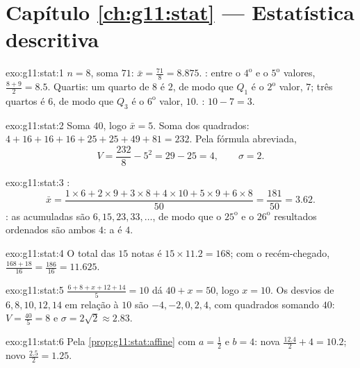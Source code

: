\section*{Capítulo \ref{ch:g11:stat} --- Estatística descritiva}

\begin{solution}{exo:g11:stat:1}
$n = 8$, soma $71$:  $\bar x = \frac{71}{8} = 8.875$. :  entre o $4^{\text{o}}$ e o $5^{\text{o}}$ valores,
$\frac{8 + 9}{2} = 8.5$. Quartis: um quarto de $8$ é $2$, de modo que
$Q_1$ é o $2^{\text{o}}$ valor, $7$; três quartos é $6$, de modo que
$Q_3$ é o $6^{\text{o}}$ valor, $10$. :
$10 - 7 = 3$.
\end{solution}

\begin{solution}{exo:g11:stat:2}
Soma $40$, logo $\bar x = 5$. Soma dos quadrados:
$4 + 16 + 16 + 16 + 25 + 25 + 49 + 81 = 232$. Pela fórmula abreviada,
\[
V = \frac{232}{8} - 5^2 = 29 - 25 = 4,
\qquad
\sigma = 2 .
\]
\end{solution}

\begin{solution}{exo:g11:stat:3}
:
\[
\bar x = \frac{1 \times 6 + 2 \times 9 + 3 \times 8 + 4 \times 10
+ 5 \times 9 + 6 \times 8}{50}
= \frac{181}{50} = 3.62 .
\]
: as  acumuladas são $6, 15, 23, 33, \dots$, de modo
que o $25^{\text{o}}$ e o $26^{\text{o}}$ resultados ordenados são ambos
$4$: a  é $4$.
\end{solution}

\begin{solution}{exo:g11:stat:4}
O total das $15$ notas é $15 \times 11.2 = 168$; com o recém-chegado,
$\frac{168 + 18}{16} = \frac{186}{16} = 11.625$.
\end{solution}

\begin{solution}{exo:g11:stat:5}
$\frac{6 + 8 + x + 12 + 14}{5} = 10$ dá $40 + x = 50$, logo $x = 10$. Os
desvios de $6, 8, 10, 12, 14$ em relação à  $10$ são
$-4, -2, 0, 2, 4$, com quadrados somando $40$: $V = \frac{40}{5} = 8$ e
$\sigma = 2\sqrt2 \approx 2.83$.
\end{solution}

\begin{solution}{exo:g11:stat:6}
Pela \cref{prop:g11:stat:affine} com $a = \frac12$ e $b = 4$: nova 
$\frac{12.4}{2} + 4 = 10.2$; novo 
$\frac{2.5}{2} = 1.25$.
\end{solution}

